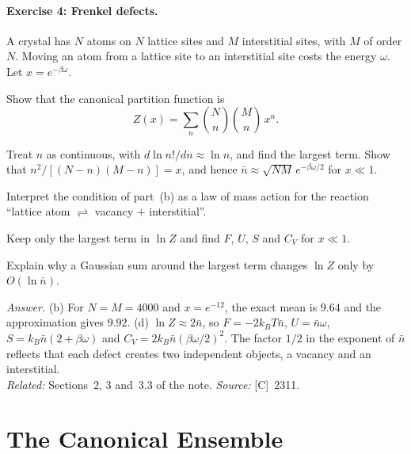 \documentclass[11pt]{article}      %
\numberwithin{equation}{section}   %
\begin{document}
\paragraph{Exercise 4: Frenkel defects.}
A crystal has $N$ atoms on $N$ lattice sites and $M$ interstitial sites, with $M$ of order $N$. Moving an atom from a lattice site to an interstitial site costs the energy $\omega$. Let $x = e^{-\beta\omega}$.
\begin{parts}
    \item Show that the canonical partition function is
    \begin{equation*}
        Z(x) = \sum_{n} \binom{N}{n}\binom{M}{n}\,x^n.
    \end{equation*}
    \item Treat $n$ as continuous, with $d\ln n!/dn \approx \ln n$, and find the largest term. Show that $n^2/[(N - n)(M - n)] = x$, and hence $\bar n \approx \sqrt{NM}\,e^{-\beta\omega/2}$ for $x \ll 1$.
    \item Interpret the condition of part~(b) as a law of mass action for the reaction ``lattice atom $\rightleftharpoons$ vacancy $+$ interstitial''.
    \item Keep only the largest term in $\ln Z$ and find $F$, $U$, $S$ and $C_V$ for $x \ll 1$.
    \item Explain why a Gaussian sum around the largest term changes $\ln Z$ only by $O(\ln\bar n)$.
\end{parts}
\textit{Answer.} (b) For $N = M = 4000$ and $x = e^{-12}$, the exact mean is $9.64$ and the approximation gives $9.92$. (d) $\ln Z \approx 2\bar n$, so $F = -2k_BT\bar n$, $U = \bar n\omega$, $S = k_B\bar n(2 + \beta\omega)$ and $C_V = 2k_B\bar n(\beta\omega/2)^2$. The factor $1/2$ in the exponent of $\bar n$ reflects that each defect creates two independent objects, a vacancy and an interstitial.\\
\textit{Related:} Sections~2, 3 and~3.3 of the note. \textit{Source:} [C]~2311.

\section{The Canonical Ensemble}
\end{document}
